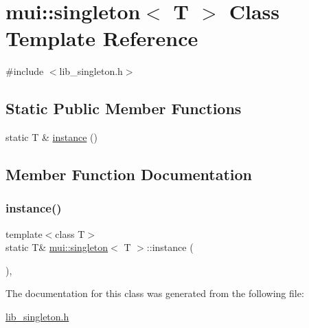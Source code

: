 \hypertarget{classmui_1_1singleton}{}\section{mui\+:\+:singleton$<$ T $>$ Class Template Reference}
\label{classmui_1_1singleton}


{\ttfamily \#include $<$lib\+\_\+singleton.\+h$>$}

\subsection*{Static Public Member Functions}
\begin{DoxyCompactItemize}
\item 
static T \& \hyperlink{classmui_1_1singleton_a62239a51420539d6a7413f153a0d439f}{instance} ()
\end{DoxyCompactItemize}


\subsection{Member Function Documentation}
\mbox{\label{classmui_1_1singleton_a62239a51420539d6a7413f153a0d439f}} 
\subsubsection{\texorpdfstring{instance()}{instance()}}
{\footnotesize\ttfamily template$<$class T$>$ \\
static T\& \hyperlink{classmui_1_1singleton}{mui\+::singleton}$<$ T $>$\+::instance (\begin{DoxyParamCaption}{ }\end{DoxyParamCaption})\hspace{0.3cm}{\ttfamily [inline]}, {\ttfamily [static]}}



The documentation for this class was generated from the following file\+:\begin{DoxyCompactItemize}
\item 
\hyperlink{lib__singleton_8h}{lib\+\_\+singleton.\+h}\end{DoxyCompactItemize}

